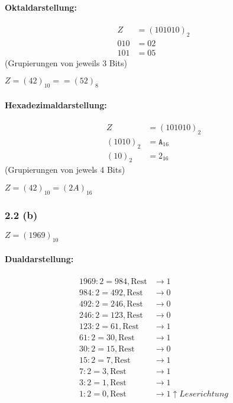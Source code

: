 \documentclass[11pt,a4paper]{article}
\begin{document}
\paragraph{Oktaldarstellung:}
\begin{align*}
Z &= (101010)_2\\
010 &= 02\\
101 &= 05
\end{align*}
(Grupierungen von jeweils 3 Bits)

$Z = (42)_10= = (52)_8$

\paragraph{Hexadezimaldarstellung:}
\begin{align*}
Z &= (101010)_2\\
(1010)_2 &= \mathtt{A}_{16}\\
(10)_2 &= 2_{16}
\end{align*}
(Grupierungen von jewels 4 Bits)

$Z = (42)_{10} = (2A)_{16}$

\subsubsection{2.2 (b)}

$Z = (1969)_{10}$

\paragraph{Dualdarstellung:}
\begin{align*}
1969 : 2 = 984, \mbox{Rest} &\rightarrow 1\\
984 : 2 = 492, \mbox{Rest} &\rightarrow 0\\
492 : 2 = 246, \mbox{Rest} &\rightarrow 0\\
246 : 2 = 123, \mbox{Rest} &\rightarrow 0\\
123 : 2 = 61, \mbox{Rest} &\rightarrow 1\\
61 : 2 = 30, \mbox{Rest} &\rightarrow 1\\
30 : 2= 15, \mbox{Rest} &\rightarrow 0\\
15 : 2 = 7, \mbox{Rest} &\rightarrow 1\\
7 : 2 = 3, \mbox{Rest} &\rightarrow 1\\
3 : 2 = 1, \mbox{Rest} &\rightarrow 1\\
1 : 2 = 0, \mbox{Rest} &\rightarrow 1 \uparrow Leserichtung
\end{align*}
\end{document}
